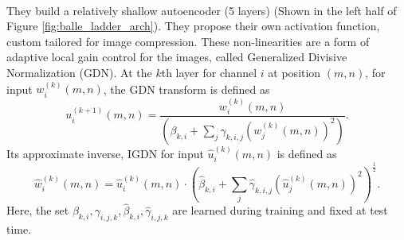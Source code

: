 \paragraph{\cite{balle2016end}} They build a relatively shallow autoencoder (5
layers) (Shown in the left half of Figure \ref{fig:balle_ladder_arch}).
They propose their own activation function, custom tailored for image
compression. These non-linearities are a form of adaptive local gain control
for the images, called Generalized Divisive Normalization (GDN). At the $k$th layer for
channel $i$ at position $(m, n)$, for input $w_i^{(k)}(m, n)$, the GDN
transform is defined as
\begin{equation}
  \label{eq:gdn_def}
  u_i^{(k + 1)}(m, n) = \frac{w_i^{(k)}(m, n)}{
    \left( \beta_{k, i} + \sum_j \gamma_{k, i, j}
      \left( w_{j}^{(k)}(m, n)\right)^2 \right)}.
\end{equation}
Its approximate inverse, IGDN for input $\hat{u}_i^{(k)}(m, n)$ is defined as
\begin{equation}
  \label{eq:igdn_def}
  \hat{w}_i^{(k)}(m, n) = \hat{u}_i^{(k)}(m, n) \cdot \left(
    \hat{\beta}_{k, i} + \sum_{j} \hat{\gamma}_{k, i, j} \left(
      \hat{u}_j^{(k)}(m, n)\right)^2 \right)^{\frac{1}{2}}.
\end{equation}
Here, the set $\beta_{k, i}, \gamma_{i, j, k}, \hat{\beta}_{k, i},
\hat{\gamma}_{i, j, k}$ are learned during training and fixed at test time.

